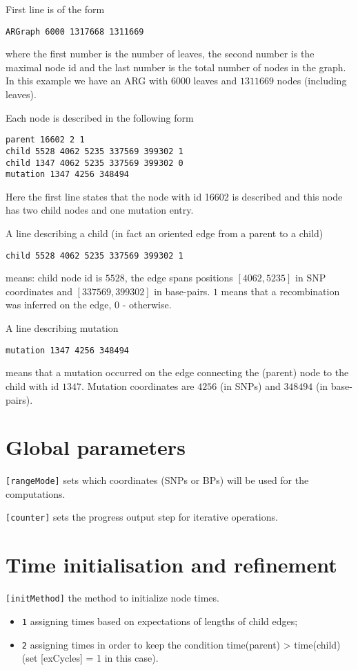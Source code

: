 \documentclass[11pt]{amsart}
\theoremstyle{definition}
\theoremstyle{remark}
\begin{document}
	First line is of the form
	\begin{displayquote}
		\texttt{ARGraph 6000 1317668 1311669}
	\end{displayquote}
	where the first number is the number of leaves, the second number is the maximal node id and the last number is the total number of nodes in the graph. In this example we have an ARG with $6000$ leaves and $1311669$ nodes (including leaves).

	Each node is described in the following form
	\begin{displayquote}
		\texttt{parent 16602 2 1\\
			child 5528 4062 5235 337569 399302 1\\
			child 1347 4062 5235 337569 399302 0\\
			mutation 1347 4256 348494}
	\end{displayquote}
	Here the first line states that the node with id 16602 is described and this node has two child nodes and one mutation entry.

	A line describing a child (in fact an oriented edge from a parent to a child)
	\begin{displayquote}
		\texttt{child 5528 4062 5235 337569 399302 1}
	\end{displayquote}
	means: child node id is $5528$, the edge spans positions $[4062, 5235]$ in SNP coordinates and $[337569, 399302]$ in base-pairs. $1$ means that a recombination was inferred on the edge, $0$ - otherwise.

	A line describing mutation
	\begin{displayquote}
		\texttt{mutation 1347 4256 348494}
	\end{displayquote}
	means that a mutation occurred on the edge connecting the (parent) node to the child with id $1347$. Mutation coordinates are $4256$ (in SNPs) and $348494$ (in base-pairs).

\section{Global parameters}
	\texttt{[rangeMode]} sets which coordinates (SNPs or BPs) will be used for the computations.
	
	\texttt{[counter]} sets the progress output step for iterative operations.

\section{Time initialisation and refinement}
	\texttt{[initMethod]} the method to initialize node times.
	\begin{itemize}
		\item \texttt{1} assigning times based on expectations of lengths of child edges;
		\item \texttt{2} assigning times in order to keep the condition time(parent) > time(child) (set [exCycles] = 1 in this case).
	\end{itemize}
	
\end{document}
